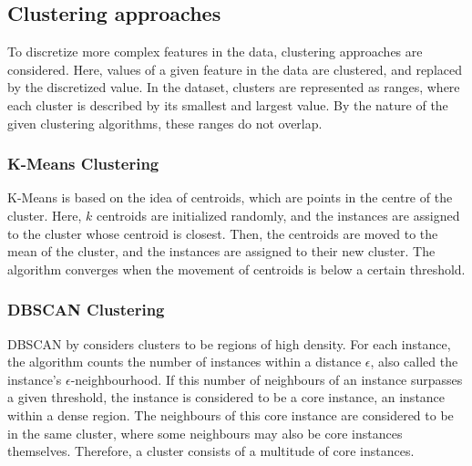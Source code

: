 \subsection*{Clustering approaches}

To discretize more complex features in the data, clustering approaches are considered. Here, values of a given feature in the data are clustered, and replaced by the discretized value. In the dataset, clusters are represented as ranges, where each cluster is described by its smallest and largest value. By the nature of the given clustering algorithms, these ranges do not overlap.

\subsubsection*{K-Means Clustering}
K-Means \citep{LeastSquareLloyd} is based on the idea of centroids, which are points in the centre of the cluster. Here, $k$ centroids are initialized randomly, and the instances are assigned to the cluster whose centroid is closest. Then, the centroids are moved to the mean of the cluster, and the instances are assigned to their new cluster. The algorithm converges when the movement of centroids is below a certain threshold.


\subsubsection*{DBSCAN Clustering}

DBSCAN  by \citet{DBSCANPaper} considers clusters to be regions of high density. For each instance, the algorithm counts the number of instances within a distance $\epsilon$, also called the instance's $\epsilon$-neighbourhood. If this number of neighbours of an instance surpasses a given threshold, the instance is considered to be a core instance, an instance within a dense region. The neighbours of this core instance are considered to be in the same cluster, where some neighbours may also be core instances themselves. Therefore, a cluster consists of a multitude of core instances. 

